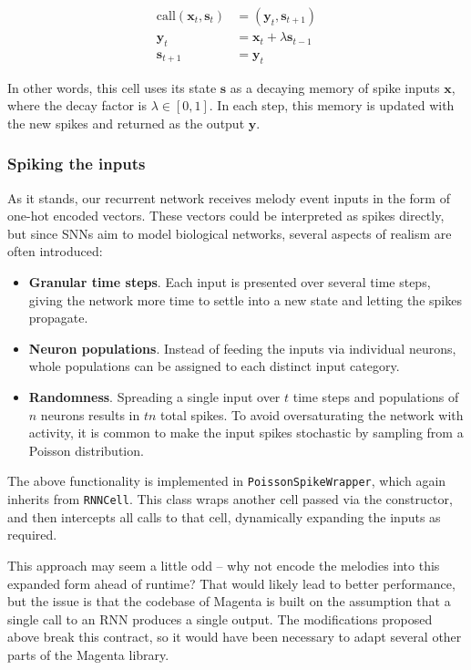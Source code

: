 \documentclass[../../report.tex]{subfiles}
\begin{document}
\begin{align}
  \mathrm{call}(\bm{x}_t, \bm{s}_t) &= (\bm{y}_t, \bm{s}_{t+1}) \\
  \bm{y}_t &= \bm{x}_t + \lambda\bm{s}_{t-1} \\
  \bm{s}_{t+1} &= \bm{y}_t
\end{align}

In other words, this cell uses its state \(\bm{s}\) as a decaying memory of
spike inputs \(\bm{x}\), where the decay factor is \(\lambda \in [0, 1]\). In
each step, this memory is updated with the new spikes and returned as the output
\(\bm{y}\).

\subsubsection{Spiking the inputs}
As it stands, our recurrent network receives melody event inputs in the form of
one-hot encoded vectors. These vectors could be interpreted as spikes directly,
but since SNNs aim to model biological networks, several aspects of realism are
often introduced:

\begin{itemize}
  \item \textbf{Granular time steps}. Each input is presented over several time
  steps, giving the network more time to settle into a new state and letting the
  spikes propagate.

  \item \textbf{Neuron populations}. Instead of feeding the inputs via
  individual neurons, whole populations can be assigned to each distinct input
  category.

  \item \textbf{Randomness}. Spreading a single input over \(t\) time steps and
  populations of \(n\) neurons results in \(tn\) total spikes. To avoid
  oversaturating the network with activity, it is common to make the input
  spikes stochastic by sampling from a Poisson distribution.
\end{itemize}

The above functionality is implemented in \texttt{PoissonSpikeWrapper}, which
again inherits from \texttt{RNNCell}. This class wraps another cell passed via
the constructor, and then intercepts all calls to that cell, dynamically
expanding the inputs as required.

This approach may seem a little odd -- why not encode the melodies into this
expanded form ahead of runtime? That would likely lead to better performance,
but the issue is that the codebase of Magenta is built on the assumption that a
single call to an RNN produces a single output. The modifications proposed above
break this contract, so it would have been necessary to adapt several other
parts of the Magenta library.
\end{document}
